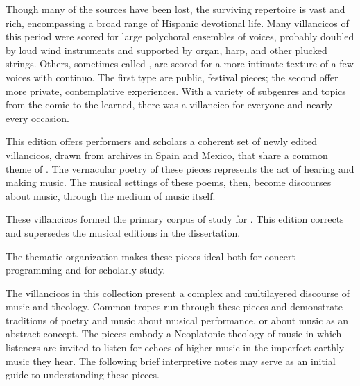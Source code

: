 Though many of the sources have been lost, the surviving repertoire is vast and 
rich, encompassing a broad range of Hispanic devotional life.
Many villancicos of this period were scored for large polychoral ensembles of 
voices, probably doubled by loud wind instruments and supported by organ, harp, 
and other plucked strings.
Others, sometimes called , are scored for a more intimate 
texture of a few voices with continuo.
The first type are public, festival pieces; the second offer more private, 
contemplative experiences.
With a variety of subgenres and topics from the comic to the learned, there was 
a villancico for everyone and nearly every occasion.

This edition offers performers and scholars a coherent set of newly edited 
villancicos, drawn from archives in Spain and Mexico, that share a common theme 
of .
The vernacular poetry of these  pieces represents the act 
of hearing and making music.
The musical settings of these poems, then, become discourses about music, 
through the medium of music itself.%
  \begin{Footnote}
      These villancicos formed the primary corpus of study for \autocite{Cashner:PhD}.
      This edition corrects and supersedes the musical editions in the dissertation.
  \end{Footnote}
The thematic organization makes these pieces ideal both for concert programming 
and for scholarly study.


The villancicos in this collection present a complex and multilayered discourse 
of music and theology.
Common tropes run through these pieces and demonstrate traditions of poetry and 
music about musical performance, or about music as an abstract concept.
The pieces embody a Neoplatonic theology of music in which listeners are 
invited to listen for echoes of higher music in the imperfect earthly music 
they hear.%
    \Autocite[108--132]{Cashner:PhD}
The following brief interpretive notes may serve as an initial guide to 
understanding these pieces.


